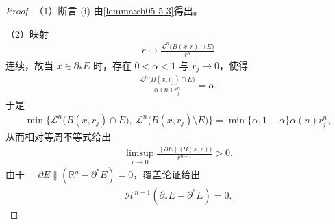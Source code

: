 \documentclass[../../main.tex]{subfiles}%
\begin{document}
\begin{proof}
（1）断言 (i) 由\cref{lemma:ch05-5-3}得出。%

（2）映射
\begin{align*}
r\longmapsto\frac{\mathcal{L}^n\bigl(B(x,r)\cap E\bigr)}{r^n}
\end{align*}
连续，故当 $x\in\partial_*E$ 时，存在 $0<\alpha<1$ 与 $r_j\to0$，使得
\begin{align*}
\frac{\mathcal{L}^n\bigl(B(x,r_j)\cap E\bigr)}{\alpha(n)r_j^n}=\alpha .
\end{align*}
于是
\begin{align*}
\min\bigl\{\mathcal{L}^n\bigl(B(x,r_j)\cap E\bigr),\ \mathcal{L}^n\bigl(B(x,r_j)\setminus E\bigr)\bigr\}
=\min\{\alpha,1-\alpha\}\alpha(n)r_j^n,
\end{align*}
从而相对等周不等式给出
\begin{align*}
\limsup_{r\to0}\frac{\lVert\partial E\rVert\bigl(B(x,r)\bigr)}{r^{n-1}}>0 .
\end{align*}
由于 $\lVert\partial E\rVert(\mathbb{R}^n-\partial^*E)=0$，覆盖论证给出
\begin{align*}
\mathcal{H}^{n-1}(\partial_*E-\partial^*E)=0 .
\end{align*}
\end{proof}
\end{document}
